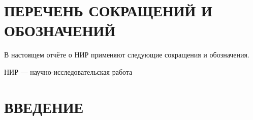\section*{ПЕРЕЧЕНЬ СОКРАЩЕНИЙ И ОБОЗНАЧЕНИЙ}

В настоящем отчёте о НИР применяют следующие сокращения и обозначения.

НИР — научно-исследовательская работа

\section*{ВВЕДЕНИЕ}
